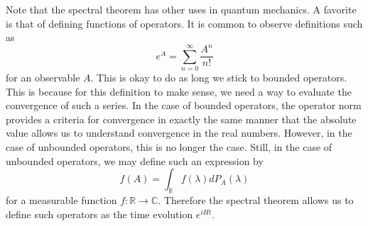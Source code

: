 \documentclass{article}
\begin{document}
Note that the spectral theorem has other uses in quantum mechanics. A favorite is that of defining functions of operators. It is common to observe definitions such as
\begin{equation}
e^A=\sum_{n=0}^\infty\frac{A^n}{n!}
\end{equation}  
for an observable $A$. This is okay to do as long we stick to bounded operators. This is because for this definition to make sense, we need a way to evaluate the convergence of such a series. In the case of bounded operators, the operator norm provides a criteria for convergence in exactly the same manner that the absolute value allows us to understand convergence in the real numbers. However, in the case of unbounded operators, this is no longer the case. Still, in the case of unbounded operators, we may define such an expression by
\begin{equation}
f(A)=\int_\mathbb{R}f(\lambda)dP_A(\lambda)
\end{equation}
for a measurable function $f:\mathbb{R}\rightarrow\mathbb{C}$. Therefore the spectral theorem allows us to define such operators as the time evolution $e^{iHt}$.



\end{document}
